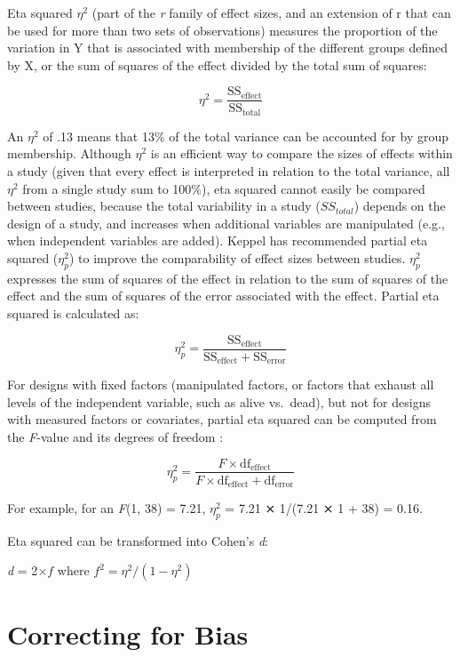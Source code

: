 \documentclass[
  oneside]{book}
\begin{document}
Eta squared \(\eta^2\) (part of the \emph{r} family of effect sizes, and an extension of r that can be used for more than two sets of observations) measures the proportion of the variation in Y that is associated with membership of the different groups defined by X, or the sum of squares of the effect divided by the total sum of squares:

\[\eta^{2} = \frac{\text{SS}_{\text{effect}}}{\text{SS}_{\text{total}}}\]

An \(\eta^2\) of .13 means that 13\% of the total variance can be accounted for by group membership. Although \(\eta^2\) is an efficient way to compare the sizes of effects within a study (given that every effect is interpreted in relation to the total variance, all \(\eta^2\) from a single study sum to 100\%), eta squared cannot easily be compared between studies, because the total variability in a study (\(SS_{total}\)) depends on the design of a study, and increases when additional variables are manipulated (e.g., when independent variables are added). Keppel \citep{keppel_design_1991} has recommended partial eta squared (\(\eta_{p}^{2}\)) to improve the comparability of effect sizes between studies. \(\eta_{p}^{2}\) expresses the sum of squares of the effect in relation to the sum of squares of the effect and the sum of squares of the error associated with the effect. Partial eta squared is calculated as:

\[\eta_{p}^{2} = \frac{\text{SS}_{\text{effect}}}{\text{SS}_{\text{effect}} + \text{SS}_{\text{error}}}\]

For designs with fixed factors (manipulated factors, or factors that exhaust all levels of the independent variable, such as alive vs.~dead), but not for designs with measured factors or covariates, partial eta squared can be computed from the \emph{F}-value and its degrees of freedom \citep{cohen_statistical_1988}:

\[\eta_{p}^{2} = \frac{F \times \text{df}_{\text{effect}}}{{F \times \text{df}}_{\text{effect}} + \text{df}_{\text{error}}}\]

For example, for an \emph{F}(1, 38) = 7.21, \(\eta_{p}^{2}\) = 7.21 ⨯ 1/(7.21 ⨯ 1 +
38) = 0.16.

Eta squared can be transformed into Cohen's \emph{d}:

\emph{d} = 2\(\times f\) where \(f^{2} = \eta^{2}/(1 - \eta^{2})\)

\hypertarget{correcting-for-bias}{%
\section{Correcting for Bias}\label{correcting-for-bias}}
\end{document}
